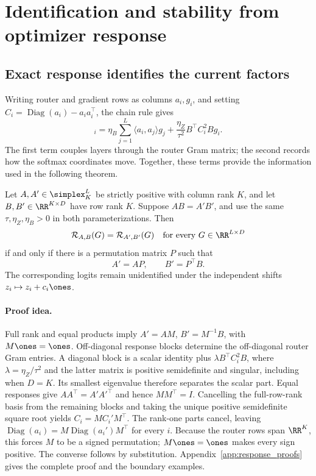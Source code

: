 \section{Identification and stability from optimizer response}
\label{sec:theory}
\subsection{Exact response identifies the current factors}
\label{sec:response_identifiability}

Writing router and gradient rows as columns $a_i,g_i$, and setting
$C_i=\operatorname{Diag}(a_i)-a_ia_i^\top$, the chain rule gives
\begin{equation}
 [\mathcal R_{A,B}(G)]_i
 =\eta_B\sum_{j=1}^L\langle a_i,a_j\rangle g_j
  +\frac{\eta_Z}{\tau^2}B^\top C_i^2B g_i.
 \label{eq:response_blocks}
\end{equation}
The first term couples layers through the router Gram matrix; the second
records how the softmax coordinates move. Together, these terms provide the information used in the following theorem.

\begin{theorem}
\label{thm:response_stabilizer}
Let \(A,A'\in\simplex_K^L\) be strictly positive with column rank \(K\),
and let \(B,B'\in\RR^{K\times D}\) have row rank \(K\).  Suppose
\(AB=A'B'\), and use the same \(\tau,\eta_Z,\eta_B>0\) in both
parameterizations.  Then
\begin{equation}
 \mathcal R_{A,B}(G)=\mathcal R_{A',B'}(G)
 \quad\text{for every }G\in\RR^{L\times D}
 \label{eq:response_equal}
\end{equation}
if and only if there is a permutation matrix \(P\) such that
\begin{equation}
 A'=AP,\qquad B'=P^\top B.
 \label{eq:response_permutation}
\end{equation}
The corresponding logits remain unidentified under the independent shifts
\(z_i\mapsto z_i+c_i\ones\).
\end{theorem}


\paragraph{Proof idea.}
Full rank and equal products imply $A'=AM$, $B'=M^{-1}B$, with
$M\ones=\ones$. Off-diagonal response blocks determine the off-diagonal
router Gram entries. A diagonal block is a scalar identity plus
$\lambda B^\top C_i^2B$, where $\lambda=\eta_Z/\tau^2$ and the latter
matrix is positive semidefinite and singular, including when $D=K$.
Its smallest eigenvalue therefore separates the scalar part. Equal
responses give $AA^\top=A'A'^\top$ and hence $MM^\top=I$.
Cancelling the full-row-rank basis from the remaining blocks and taking
the unique positive semidefinite square root yields
$C_i=M C_i'M^\top$.
The rank-one parts cancel, leaving
$\operatorname{Diag}(a_i)=M\operatorname{Diag}(a_i')M^\top$ for every $i$.
Because the router rows span $\RR^K$, this forces $M$ to be a signed
permutation; $M\ones=\ones$ makes every sign positive.
The converse follows by substitution. Appendix~\ref{app:response_proofs}
gives the complete proof and the boundary examples.

